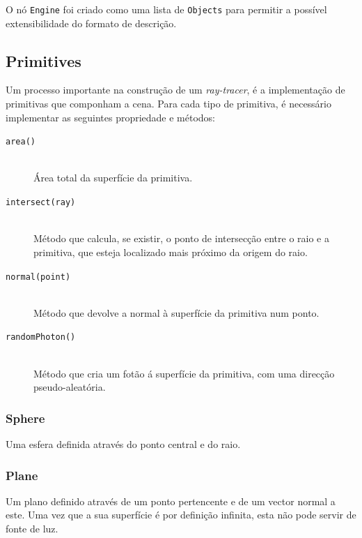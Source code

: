 \documentclass[a4paper]{article}
\begin{document}
O nó \texttt{Engine} foi criado como uma lista de \texttt{Objects} para permitir a possível extensibilidade do formato de descrição.

\cleardoublepage
\subsection{Primitives}
\label{sec:primitives}
\indent \indent Um processo importante na construção de um \emph{ray-tracer}, é a implementação de primitivas que componham a cena.
Para cada tipo de primitiva, é necessário implementar as seguintes propriedade e métodos:

\begin{description}
	\item [\texttt{area()}] \hfill \\
		Área total da superfície da primitiva.

	\item [\texttt{intersect(ray)}] \hfill \\
		Método que calcula, se existir, o ponto de intersecção entre o raio e a primitiva, que esteja localizado
		mais próximo da origem do raio.

	\item [\texttt{normal(point)}] \hfill \\
		Método que devolve a normal à superfície da primitiva num ponto.

	\item [\texttt{randomPhoton()}] \hfill \\
		Método que cria um fotão á superfície da primitiva, com uma direcção pseudo-aleatória.
 
\end{description}

\subsubsection{Sphere}
\indent \indent Uma esfera definida através do ponto central e do raio.   

\subsubsection{Plane}
\indent \indent Um plano definido através de um ponto pertencente e de um vector normal a este.
Uma vez que a sua superfície é por definição infinita, esta não pode servir de fonte de luz.
\end{document}
